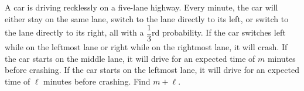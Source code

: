 A car is driving recklessly on a five-lane highway. Every minute, the car will either stay on the same lane, switch to the lane directly to its left, or switch to the lane directly to its right, all with a $\dfrac{1}{3}$rd probability. If the car switches left while on the leftmost lane or right while on the rightmost lane, it will crash. If the car starts on the middle lane, it will drive for an expected time of $m$ minutes before crashing. If the car starts on the leftmost lane, it will drive for an expected time of $\ell$ minutes before crashing. Find $m + \ell$.
